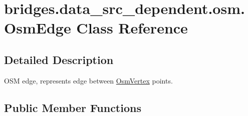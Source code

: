 \hypertarget{classbridges_1_1data__src__dependent_1_1osm_1_1_osm_edge}{}\section{bridges.\+data\+\_\+src\+\_\+dependent.\+osm.\+Osm\+Edge Class Reference}
\label{classbridges_1_1data__src__dependent_1_1osm_1_1_osm_edge}


\subsection{Detailed Description}
O\+SM edge, represents edge between \mbox{\hyperlink{classbridges_1_1data__src__dependent_1_1osm_1_1_osm_vertex}{Osm\+Vertex}} points. \subsection*{Public Member Functions}

